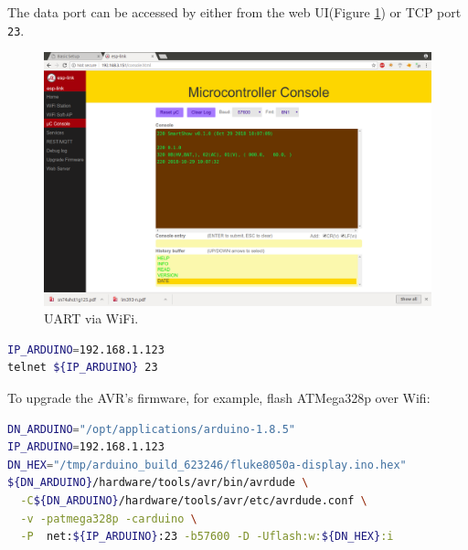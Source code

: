 \documentclass[a4paper,10pt]{article}
\begin{document}
The data port can be accessed by either from the web UI(Figure \ref{fig:smartshow-ctrlwin}) or TCP port \texttt{23}.
\begin{figure}[h!t] \centering
    \includegraphics[width=0.8\linewidth]{figures/smartshow-ctrlwin.png}
    \caption{UART via WiFi.} \label{fig:smartshow-ctrlwin}
\end{figure}
\begin{lstlisting}[language=bash]
IP_ARDUINO=192.168.1.123
telnet ${IP_ARDUINO} 23
\end{lstlisting}




To upgrade the AVR's firmware, for example,
flash ATMega328p over Wifi:
\begin{lstlisting}[language=bash]
DN_ARDUINO="/opt/applications/arduino-1.8.5"
IP_ARDUINO=192.168.1.123
DN_HEX="/tmp/arduino_build_623246/fluke8050a-display.ino.hex"
${DN_ARDUINO}/hardware/tools/avr/bin/avrdude \
  -C${DN_ARDUINO}/hardware/tools/avr/etc/avrdude.conf \
  -v -patmega328p -carduino \
  -P  net:${IP_ARDUINO}:23 -b57600 -D -Uflash:w:${DN_HEX}:i
\end{lstlisting}
\end{document}
